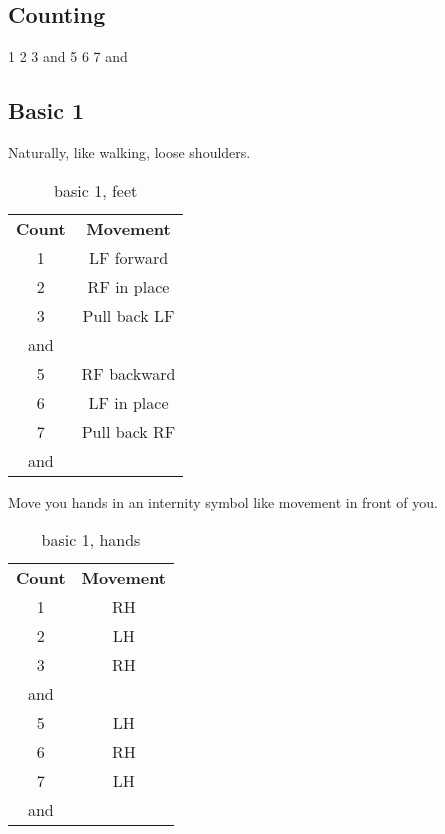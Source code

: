 \subsection{Counting}
1 2 3 and 5 6 7 and

\subsection{Basic 1}
Naturally, like walking, loose shoulders.
\begin{table}[H]
\centering
\begin{tabular}{cc}
  \toprule
  \textbf{Count} & \textbf{Movement}\\
  \cmidrule(lr){1-1}\cmidrule(lr){2-2}
  1 & LF forward\\
  2 & RF in place\\
  3 & Pull back LF\\
  and &\\
  5 & RF backward\\
  6 & LF in place\\
  7 & Pull back RF\\
  and &\\
  \bottomrule
\end{tabular}
\label{basic1_feet}
\caption{basic 1, feet}
\end{table}

Move you hands in an internity symbol like movement in front of you.
\begin{table}[H]
\centering
\begin{tabular}{cc}
  \toprule
  \textbf{Count} & \textbf{Movement}\\
  \cmidrule(lr){1-1}\cmidrule(lr){2-2}
  1 & RH\\
  2 & LH\\
  3 & RH\\
  and & \\
  5 & LH\\
  6 & RH\\
  7 & LH\\
  and & \\
  \bottomrule
\end{tabular}
\label{basic1_hands}
\caption{basic 1, hands}
\end{table}

